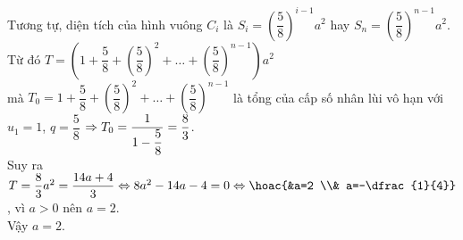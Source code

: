 \begin{bt}
{{\begin{tikzpicture}[scale=0.8,>=stealth, font=\footnotesize, line join=round, line cap=round]
					\end{tikzpicture}}
	\noindent 	Tương tự, diện tích của hình vuông $C_i$ là $S_i=\left(\dfrac{5}{8}\right)^{i-1} a^2$ hay $S_n=\left(\dfrac{5}{8}\right)^{n-1} a^2$.\\
	Từ đó $T=\left(1+\dfrac{5}{8}+\left(\dfrac{5}{8}\right)^2+\ldots+\left(\dfrac{5}{8}\right)^{n-1}\right) a^2$\\ mà $T_0=1+\dfrac{5}{8}+\left(\dfrac{5}{8}\right)^2+\ldots+\left(\dfrac{5}{8}\right)^{n-1}$ là tổng của cấp số nhân lùi vô hạn với $u_1=1$, $q=\dfrac{5}{8}$ $\break\Rightarrow T_0=\dfrac{1}{1-\dfrac{5}{8}}=\dfrac{8}{3}$.\\
	Suy ra $T=\dfrac{8}{3} a^2=\dfrac{14 a+4}{3} \Leftrightarrow 8 a^2-14 a-4=0 \Leftrightarrow\hoac{&a=2 \\& a=-\dfrac{1}{4}}$, vì $a>0$ nên $a=2$. \\
	Vậy $a=2$.
	}
\end{bt}

